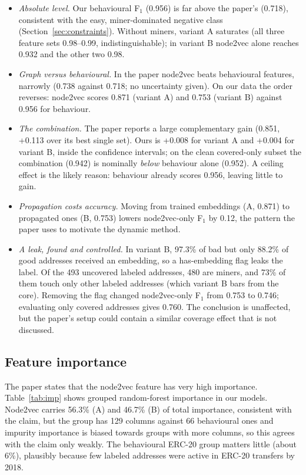 \documentclass[11pt,a4paper]{article}
\begin{document}
\begin{itemize}
\item \emph{Absolute level.} Our behavioural F$_1$ (0.956) is far above the paper's (0.718), consistent with the easy, miner-dominated negative class (Section~\ref{sec:constraints}). Without miners, variant A saturates (all three feature sets 0.98--0.99, indistinguishable); in variant B node2vec alone reaches 0.932 and the other two 0.98.
\item \emph{Graph versus behavioural.} In the paper node2vec beats behavioural features, narrowly (0.738 against 0.718; no uncertainty given). On our data the order reverses: node2vec scores 0.871 (variant A) and 0.753 (variant B) against 0.956 for behaviour.
\item \emph{The combination.} The paper reports a large complementary gain (0.851, +0.113 over its best single set). Ours is +0.008 for variant A and +0.004 for variant B, inside the confidence intervals; on the clean covered-only subset the combination (0.942) is nominally \emph{below} behaviour alone (0.952). A ceiling effect is the likely reason: behaviour already scores 0.956, leaving little to gain.
\item \emph{Propagation costs accuracy.} Moving from trained embeddings (A, 0.871) to propagated ones (B, 0.753) lowers node2vec-only F$_1$ by 0.12, the pattern the paper uses to motivate the dynamic method.
\item \emph{A leak, found and controlled.} In variant B, 97.3\% of bad but only 88.2\% of good addresses received an embedding, so a has-embedding flag leaks the label. Of the 493 uncovered labeled addresses, 480 are miners, and 73\% of them touch only other labeled addresses (which variant B bars from the core). Removing the flag changed node2vec-only F$_1$ from 0.753 to 0.746; evaluating only covered addresses gives 0.760. The conclusion is unaffected, but the paper's setup could contain a similar coverage effect that is not discussed.
\end{itemize}

\subsection{Feature importance}
The paper states that the node2vec feature has very high importance. Table~\ref{tab:imp} shows grouped random-forest importance in our models. Node2vec carries 56.3\% (A) and 46.7\% (B) of total importance, consistent with the claim, but the group has 129 columns against 66 behavioural ones and impurity importance is biased towards groups with more columns, so this agrees with the claim only weakly. The behavioural ERC-20 group matters little (about 6\%), plausibly because few labeled addresses were active in ERC-20 transfers by 2018.
\begin{table}[H]
\centering\footnotesize

\caption{Grouped random-forest importance (combined feature set).}
\label{tab:imp}
\end{table}
\end{document}
